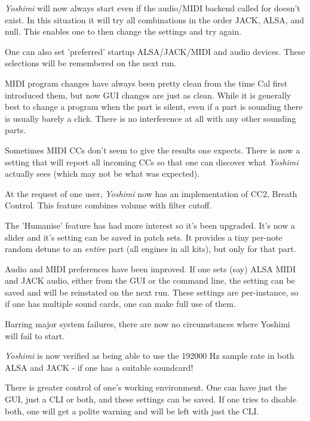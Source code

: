 \documentclass[
 11pt,
 twoside,
 a4paper,
 final                                 %
]{article}
\begin{document}
   \textsl{Yoshimi} will now always start even if the audio/MIDI backend called
   for doesn't exist. In this situation it will try all combinations in the
   order JACK, ALSA, and null. This enables one to then change the settings and
   try again.

   One can also set 'preferred' startup ALSA/JACK/MIDI and audio devices.
   These selections will be remembered on the next run.

   MIDI program changes have always been pretty clean from the time Cal first
   introduced them, but now GUI changes are just as clean. While it is
   generally best to change a program when the part is silent, even if a part
   is sounding there is usually barely a click. There is no interference at all
   with any other sounding parts.

   Sometimes MIDI CCs don't seem to give the results one expects. There is
   now a setting that will report all incoming CCs so that one can discover
   what \textsl{Yoshimi} actually sees (which may not be what was expected).

   At the request of one user, \textsl{Yoshimi} now has an
   implementation of CC2, Breath Control.
   This feature combines volume with
   filter cutoff.

   The 'Humanise' feature has had more interest so it's been upgraded. It's now
   a slider and it's setting can be saved in patch sets. It provides a tiny
   per-note random detune to an \textsl{entire} part (all engines in all kits),
   but only for that part.

   Audio and MIDI preferences have been improved. If one sets (say) ALSA MIDI
   and JACK audio, either from the GUI or the command line, the setting can be
   saved and will be reinstated on the next run. These settings are
   per-instance, so if one has multiple sound cards, one can make full use of
   them.

   Barring major system failures, there are now no circumstances where Yoshimi
   will fail to start.

   \textsl{Yoshimi} is now verified as being able to use the 192000 Hz sample
   rate in both ALSA and JACK - if one has a suitable soundcard!

   There is greater control of one's working environment. One can have just the
   GUI, just a CLI or both, and these settings can be saved. If one tries to
   disable both, one will get a polite warning and will be left with just the
   CLI.
\end{document}
